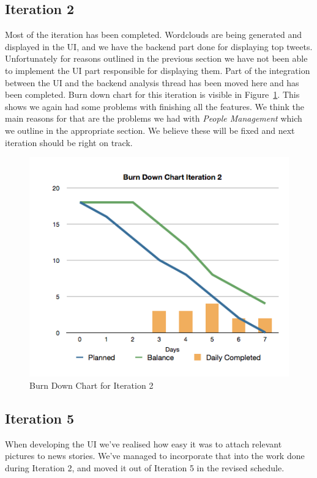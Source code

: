\documentclass[a4paper,12pt]{article}
\begin{document}
	\subsection{Iteration 2}
	Most of the iteration has been completed. Wordclouds are being generated and displayed in the UI, and we have the backend part done for displaying top tweets. Unfortunately for reasons outlined in the previous section we have not been able to implement the UI part responsible for displaying them. Part of the integration between the UI and the backend analysis thread has been moved here and has been completed. Burn down chart for this iteration is visible in Figure~\ref{burndown2}. This shows we again had some problems with finishing all the features. We think the main reasons for that are the problems we had with \emph{People Management} which we outline in the appropriate section. We believe these will be fixed and next iteration should be right on track.
	\begin{figure}
	  \begin{center}
	    \caption{\label{burndown2} Burn Down Chart for Iteration 2}
		\includegraphics[scale=0.6]{burndown2.png}
	  \end{center}
	\end{figure}
	
	\subsection{Iteration 5}
	When developing the UI we've realised how easy it was to attach relevant pictures to news stories. We've managed to incorporate that into the work done during Iteration 2, and moved it out of Iteration 5 in the revised schedule. 
	
\end{document}
